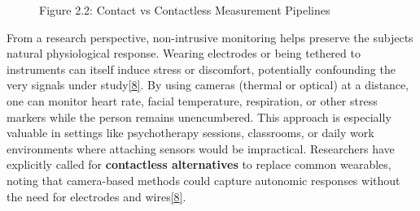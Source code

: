 \documentclass[12pt,a4paper]{article}
\begin{document}
\begin{figure}
\centering
{}
\caption{Figure 2.2: Contact vs Contactless Measurement Pipelines}
\end{figure}

From a research perspective, non-intrusive monitoring helps preserve the subject\textquotesingle s natural physiological response. Wearing electrodes or being tethered to instruments can itself induce stress or discomfort, potentially confounding the very signals under study\href{https://pmc.ncbi.nlm.nih.gov/articles/PMC10385045/\#:~:text=Numerous\%20studies\%20have\%20investigated\%20the,natural\%20physiological\%20responses\%20under\%20study}{{[}8{]}}. By using cameras (thermal or optical) at a distance, one can monitor heart rate, facial temperature, respiration, or other stress markers while the person remains unencumbered. This approach is especially valuable in settings like psychotherapy sessions, classrooms, or daily work environments where attaching sensors would be impractical. Researchers have explicitly called for \textbf{contactless alternatives} to replace common wearables, noting that camera-based methods could capture autonomic responses without the need for electrodes and wires\href{https://pmc.ncbi.nlm.nih.gov/articles/PMC10385045/\#:~:text=Numerous\%20studies\%20have\%20investigated\%20the,natural\%20physiological\%20responses\%20under\%20study}{{[}8{]}}.
\end{document}
